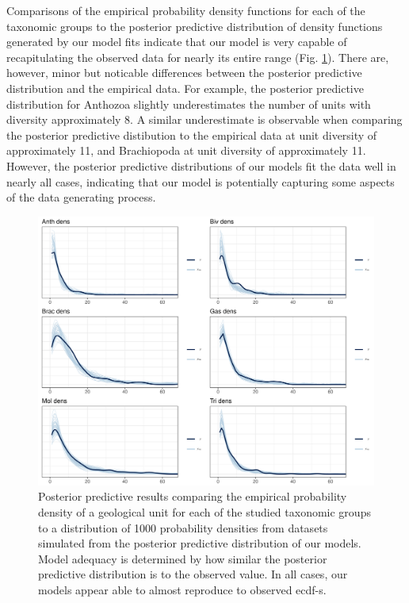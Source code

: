 \documentclass[12pt,letterpaper]{article}
\begin{document}
Comparisons of the empirical probability density functions for each of the taxonomic groups to the posterior predictive distribution of density functions generated by our model fits indicate that our model is very capable of recapitulating the observed data for nearly its entire range (Fig. \ref{fig:ppc_dens}). There are, however, minor but noticable differences between the posterior predictive distribution and the empirical data. For example, the posterior predictive distribution for Anthozoa slightly underestimates the number of units with diversity approximately 8. A similar underestimate is observable when comparing the posterior predictive distibution to the empirical data at unit diversity of approximately 11, and Brachiopoda at unit diversity of approximately 11. However, the posterior predictive distributions of our models fit the data well in nearly all cases, indicating that our model is potentially capturing some aspects of the data generating process.
\begin{figure}[ht]
  \centering
  \includegraphics[width=\textwidth,height=0.5\textheight,keepaspectratio=true]{figure/ppc_dens_zoom_diversity}
  \caption{Posterior predictive results comparing the empirical probability density of a geological unit for each of the studied taxonomic groups to a distribution of 1000 probability densities from datasets simulated from the posterior predictive distribution of our models. Model adequacy is determined by how similar the posterior predictive distribution is to the observed value. In all cases, our models appear able to almost reproduce to observed ecdf-s.}
  \label{fig:ppc_dens}
\end{figure}
\end{document}
